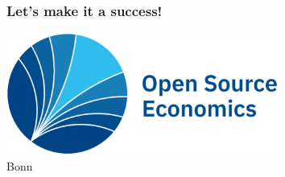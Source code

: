\begin{frame}[standout]\frametitle{Let's make it a success!}\vspace{1cm}

\hspace{3cm}\includegraphics[height=4cm]{material/crop-ose-logo.pdf}\\[-1cm]
\hspace{7.45cm}\textcolor{OSEBlue}{\fontsize{23pt}{20pt}\selectfont Bonn}

\end{frame}
